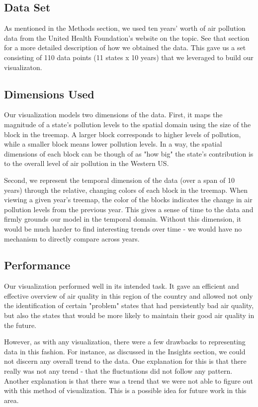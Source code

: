 \documentclass[journal]{vgtc}                %
\begin{document}
\subsection{Data Set}

As mentioned in the Methods section, we used ten years' worth of air pollution data from the United Health Foundation's
website on the topic. See that section for a more detailed description of how we obtained the data. 
This gave us a set consisting of 110 data points (11 states x 10 years) that we leveraged to build our visualizaton. 

\subsection{Dimensions Used}

Our visualization models two dimensions of the data. First, it maps the magnitude of a state's pollution levels to 
the spatial domain using the size of the block in the treemap. A larger block corresponds to higher levels of pollution, 
while a smaller block means lower pollution levels. In a way, the spatial dimensions of each block can be though of as 
"how big" the state's contribution is to the overall level of air pollution in the Western US.

Second, we represent the temporal dimension of the data (over a span of 10 years) through the relative, changing colors of each block
in the treemap. When viewing a given year's treemap, the color of the blocks indicates the change in air pollution levels 
from the previous year. This gives a sense of time to the data and firmly grounds our model in the temporal domain. Without
this dimension, it would be much harder to find interesting trends over time - we would have no mechanism to directly compare 
across years.

\subsection{Performance}

Our visualization performed well in its intended task. It gave an efficient and effective overview of air quality in this 
region of the country and allowed not only the identification of certain "problem" states that had persistently bad
air quality, but also the states that would be more likely to maintain their good air quality in the future.

However, as with any visualization, there were a few drawbacks to representing data in this fashion. For instance, as discussed
in the Insights section, we could not discern any overall trend to the data. One explanation for this is that there really was
not any trend - that the fluctuations did not follow any pattern. Another explanation is that there was a trend that we were not
able to figure out with this method of visualization. This is a possible idea for future work in this area. 
\end{document}
